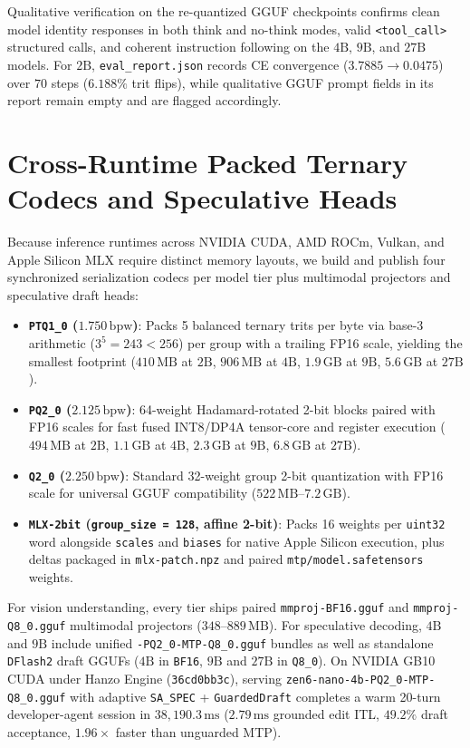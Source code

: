 \documentclass[11pt,a4paper]{article}
\begin{document}
Qualitative verification on the re-quantized GGUF checkpoints confirms clean model identity responses in both think and no-think modes, valid \texttt{<tool\_call>} structured calls, and coherent instruction following on the $4\text{B}$, $9\text{B}$, and $27\text{B}$ models. For $2\text{B}$, \texttt{eval\_report.json} records CE convergence ($3.7885 \to 0.0475$) over $70$ steps ($6.188\%$ trit flips), while qualitative GGUF prompt fields in its report remain empty and are flagged accordingly.

\section{Cross-Runtime Packed Ternary Codecs and Speculative Heads}

Because inference runtimes across NVIDIA CUDA, AMD ROCm, Vulkan, and Apple Silicon MLX require distinct memory layouts, we build and publish four synchronized serialization codecs per model tier plus multimodal projectors and speculative draft heads:
\begin{itemize}[noitemsep]
  \item \textbf{\texttt{PTQ1\_0} ($1.750\,\text{bpw}$)}: Packs 5 balanced ternary trits per byte via base-3 arithmetic ($3^5 = 243 < 256$) per group with a trailing FP16 scale, yielding the smallest footprint ($410\,\text{MB}$ at $2\text{B}$, $906\,\text{MB}$ at $4\text{B}$, $1.9\,\text{GB}$ at $9\text{B}$, $5.6\,\text{GB}$ at $27\text{B}$).
  \item \textbf{\texttt{PQ2\_0} ($2.125\,\text{bpw}$)}: 64-weight Hadamard-rotated 2-bit blocks paired with FP16 scales for fast fused INT8/DP4A tensor-core and register execution ($494\,\text{MB}$ at $2\text{B}$, $1.1\,\text{GB}$ at $4\text{B}$, $2.3\,\text{GB}$ at $9\text{B}$, $6.8\,\text{GB}$ at $27\text{B}$).
  \item \textbf{\texttt{Q2\_0} ($2.250\,\text{bpw}$)}: Standard 32-weight group 2-bit quantization with FP16 scale for universal GGUF compatibility ($522\,\text{MB}$--$7.2\,\text{GB}$).
  \item \textbf{\texttt{MLX-2bit} (\texttt{group\_size = 128}, affine 2-bit)}: Packs 16 weights per \texttt{uint32} word alongside \texttt{scales} and \texttt{biases} for native Apple Silicon execution, plus deltas packaged in \texttt{mlx-patch.npz} and paired \texttt{mtp/model.safetensors} weights.
\end{itemize}
For vision understanding, every tier ships paired \texttt{mmproj-BF16.gguf} and \texttt{mmproj-Q8\_0.gguf} multimodal projectors ($348$--$889\,\text{MB}$). For speculative decoding, $4\text{B}$ and $9\text{B}$ include unified \texttt{-PQ2\_0-MTP-Q8\_0.gguf} bundles as well as standalone \texttt{DFlash2} draft GGUFs ($4\text{B}$ in \texttt{BF16}, $9\text{B}$ and $27\text{B}$ in \texttt{Q8\_0}). On NVIDIA GB10 CUDA under Hanzo Engine (\texttt{36cd0bb3c}), serving \texttt{zen6-nano-4b-PQ2\_0-MTP-Q8\_0.gguf} with adaptive \texttt{SA\_SPEC} + \texttt{GuardedDraft} completes a warm 20-turn developer-agent session in $38{,}190.3\,\text{ms}$ ($2.79\,\text{ms}$ grounded edit ITL, $49.2\%$ draft acceptance, $1.96\times$ faster than unguarded MTP).
\end{document}
